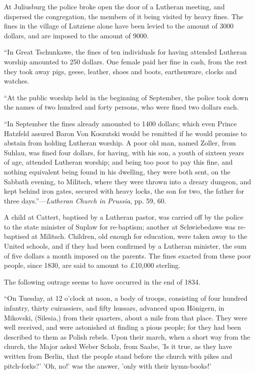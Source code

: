 At Juliusburg the police broke open the door of a
Lutheran meeting, and dispersed the congregation, the members of it
being visited by heavy fines. The fines in the village of Lutziene alone
have been levied to the amount of 3000 dollars, and are imposed to the
amount of 9000.

``In Great Tschunkawe, the fines of
ten individuals for having attended Lutheran worship amounted to 250
dollars. One female paid her fine in cash, from the rest they took away
pigs, geese, leather, shoes and boots, earthenware, clocks and watches.

``At the public worship held in the
beginning of September, the police took down the names of two hundred
and forty persons, who were fined two dollars each.

``In September the fines already
amounted to 1400 dollars; which even Prince Hatzfeld assured Baron Von
Koszutski would be remitted if he would promise to abstain from holding
Lutheran worship. A poor old man, named Zoller, from Suhlau, was fined
four dollars, for having, with his son, a youth of sixteen years of age,
attended Lutheran worship; and being too poor to pay this fine, and
nothing equivalent being found in his dwelling, they were both sent, on
the Sabbath evening, to Militsch, where they were thrown into a dreary
dungeon, and kept behind iron gates, secured with heavy locks, the son
for two, the father for three days.''—\emph{Lutheran Church in Prussia},
pp. 59, 60.

A child at Cattert, baptised by a Lutheran pastor,
was carried off by the police to the state minister of Suplaw for
re-baptism; another at Schwiebedawe was re-baptised at Militsch.
Children, old enough for education, were taken away to the United
schools, and if they had been confirmed by a Lutheran minister, the sum
of five dollars a month imposed on the parents. The fines exacted from
these poor people, since 1830, are said to amount to £10,000 sterling.

The following outrage seems to have occurred in the
end of 1834.

``On Tuesday, at 12 o'clock at noon,
a body of troops, consisting of four hundred infantry, thirty
cuirassiers, and fifty hussars, advanced upon Hönigern, in Mikovski,
(Silesia,) from their quarters, about a mile from that place. They were
well received, and were astonished at finding a pious people; for they
had been described to them as Polish rebels. Upon their march, when a
short way from the church, the Major asked Weber Scholz, from Saabe, 'Is
it true, as they have written from Berlin, that the people stand before
the church with pikes and pitch-forks?' 'Oh, no!' was the answer, 'only
with their hymn-books!'

